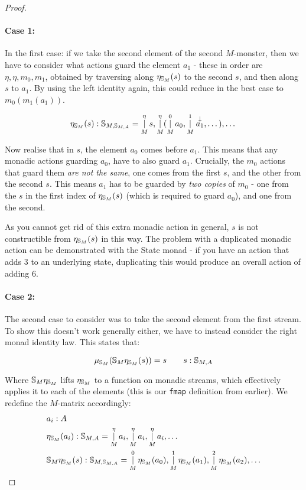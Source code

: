 \documentclass{article}
\begin{document}
\begin{proof}
\paragraph{Case 1:}

In the first case: if we take the second element of the second $M$-monster, then we have to consider what actions guard the element $a_1$ - these in order are $\eta, \eta, m_0, m_1$, obtained by traversing along $\eta_{\mathbb{S}_{M}}(s)$ to the second $s$, and then along $s$ to $a_1$. By using the left identity again, this could reduce in the best case to $m_0(m_1(a_1))$.

$$
\eta_{\mathbb{S}_{M}}(s) : \mathbb{S}_{M,\mathbb{S}_{M,A}} = \mathop{|}_M^\eta s, \mathop{|}_M^\eta (\mathop{|}_M^0 a_0, \mathop{|}_M^1 \stackrel{\downarrow}{a_1}, \dots), \dots
$$

Now realise that in $s$, the element $a_0$ comes before $a_1$. This means that any monadic actions guarding $a_0$, have to also guard $a_1$. Crucially, the $m_0$ actions that guard them \emph{are not the same}, one comes from the first $s$, and the other from the second $s$. This means $a_1$ has to be guarded by \emph{two copies} of $m_0$ - one from the $s$ in the first index of $\eta_{\mathbb{S}_{M}}(s)$ (which is required to guard $a_0$), and one from the second. 

As you cannot get rid of this extra monadic action in general, $s$ is not constructible from $\eta_{\mathbb{S}_{M}}(s)$ in this way. The problem with a duplicated monadic action can be demonstrated with the State monad - if you have an action that adds $3$ to an underlying state, duplicating this would produce an overall action of adding $6$.\\


\paragraph{Case 2:} 

The second case to consider was to take the second element from the first stream. To show this doesn't work generally either, we have to instead consider the right monad identity law. This states that:

$$
\mu_{\mathbb{S}_{M}}(\mathbb{S}_{M}\eta_{\mathbb{S}_{M}}(s)) = s
\qquad s : \mathbb{S}_{M,A}
$$

Where $\mathbb{S}_{M}\eta_{\mathbb{S}_{M}}$ lifts $\eta_{\mathbb{S}_{M}}$ to a function on monadic streams, which effectively applies it to each of the elements (this is our \verb+fmap+ definition from earlier). We redefine the $M$-matrix accordingly:
\begin{align*}
&a_i : A\\
&\eta_{\mathbb{S}_{M}}(a_i) : \mathbb{S}_{M,A} = \mathop{|}_M^\eta a_i, \mathop{|}_M^\eta a_i, \mathop{|}_M^\eta  a_i, \dots\\
&\mathbb{S}_{M}\eta_{\mathbb{S}_{M}}(s) : \mathbb{S}_{M,\mathbb{S}_{M,A}} = \mathop{|}_M^0 \eta_{\mathbb{S}_{M}}(a_0), \mathop{|}_M^1 \eta_{\mathbb{S}_{M}}(a_1), \mathop{|}_M^2 \eta_{\mathbb{S}_{M}}(a_2), \dots
\end{align*}


\end{proof}
\end{document}
